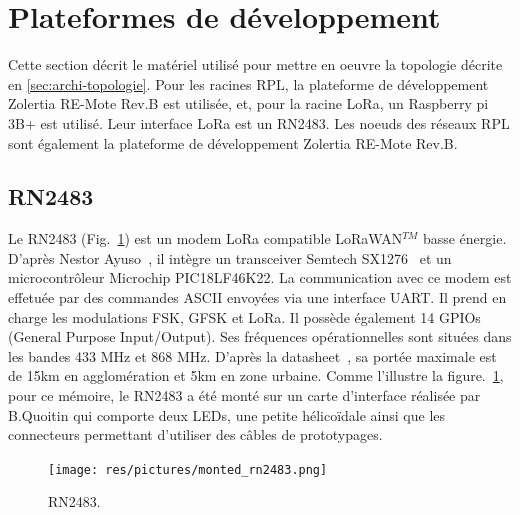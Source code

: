 \section{Plateformes de développement}\label{hardware}
\renewcommand{\rightmark}{Plateformes de développement}
    Cette section décrit le matériel utilisé pour mettre en oeuvre la topologie décrite en
    \autoref{sec:archi-topologie}. Pour les racines RPL, la plateforme de développement Zolertia 
    RE-Mote Rev.B est utilisée, et, pour la racine LoRa, un Raspberry pi 3B+ est utilisé. 
    Leur interface LoRa est un RN2483. Les noeuds des réseaux RPL sont également la plateforme de 
    développement Zolertia RE-Mote Rev.B.

\subsection*{RN2483}\label{hardware:rn2483}
    Le RN2483 (Fig.~\ref{fig:state-rn2483}) est un modem LoRa compatible LoRaWAN$^{TM}$ basse énergie. D'après Nestor Ayuso~\cite{ayuso_2015}, il intègre un transceiver Semtech SX1276~\cite{sx1276:datasheet} et un microcontrôleur Microchip PIC18LF46K22.
    La communication avec ce modem est effetuée par des commandes ASCII envoyées via une interface UART. Il prend en charge les modulations FSK, GFSK et LoRa. Il possède également 14 GPIOs (General Purpose Input/Output).
    Ses fréquences opérationnelles sont situées dans les bandes 433 MHz et 868 MHz.
    D'après la datasheet~\cite{rn2483:datasheet}, 
    sa portée maximale est de 15km en agglomération et 5km en zone urbaine. Comme l'illustre la figure.~\ref{fig:state-rn2483}, pour ce mémoire, le RN2483 a été monté sur un carte d'interface réalisée par B.Quoitin qui comporte deux LEDs, une petite hélicoïdale ainsi que les connecteurs permettant d'utiliser des câbles de prototypages.

    \begin{figure}[H]
        \centering
        \texttt{[image: res/pictures/monted\_rn2483.png]}
        \caption{RN2483.}
        \label{fig:state-rn2483}
    \end{figure}

